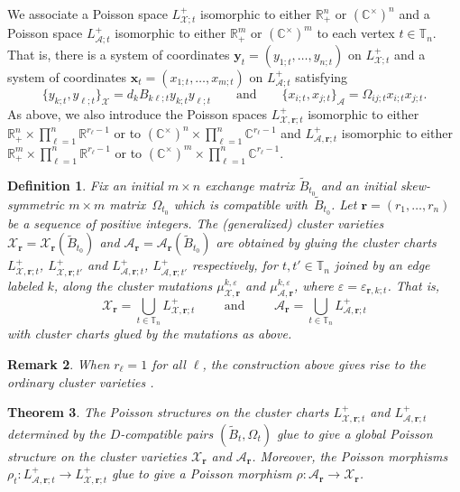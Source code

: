 \documentclass{amsart}
\newtheorem{theorem}{Theorem}[section]
\newtheorem{definition}[theorem]{Definition}
\newtheorem{remark}[theorem]{Remark}
\numberwithin{equation}{section}
\newcommand{\bfr}{{\boldsymbol{r}}}
\newcommand{\bfx}{{\boldsymbol{x}}}
\newcommand{\bfy}{{\boldsymbol{y}}}
\newcommand{\cA}{\mathcal{A}}
\newcommand{\cX}{\mathcal{X}}
\newcommand{\CC}{\mathbb{C}}
\newcommand{\RR}{\mathbb{R}}
\newcommand{\TT}{\mathbb{T}}
\begin{document}
We associate a Poisson space $L^+_{\cX;t}$ isomorphic to either $\RR_+^n$ or $(\CC^\times)^n$ and a Poisson space $L^+_{\cA;t}$ isomorphic to either $\RR_+^m$ or $(\CC^\times)^m$ to each vertex $t\in\TT_n$.
That is, there is a system of coordinates $\bfy_t=(y_{1;t},\ldots,y_{n;t})$ on $L^+_{\cX;t}$ and a system of coordinates $\bfx_t=(x_{1;t},\ldots,x_{m;t})$ on $L^+_{\cA;t}$ satisfying
\begin{equation}
  \label{eq:brackets3}
  \{y_{k;t},y_{\ell;t}\}_\cX=d_kB_{k\ell;t}y_{k;t}y_{\ell;t}\qquad\text{and}\qquad\{x_{i;t},x_{j;t}\}_\cA=\Omega_{ij;t}x_{i;t}x_{j;t}.
\end{equation}
As above, we also introduce the Poisson spaces $L^+_{\cX,\bfr;t}$ isomorphic to either $\RR_+^n\times\prod_{\ell=1}^n \RR^{r_\ell-1}$ or to $(\CC^\times)^n\times\prod_{\ell=1}^n \CC^{r_\ell-1}$ and $L^+_{\cA,\bfr;t}$ isomorphic to either $\RR_+^m\times\prod_{\ell=1}^n \RR^{r_\ell-1}$ or to $(\CC^\times)^m\times\prod_{\ell=1}^n \CC^{r_\ell-1}$.

\begin{definition}
  \label{def:cluster varieties}
  Fix an initial $m\times n$ exchange matrix $\tilde B_{t_0}$ and an initial skew-symmetric $m\times m$ matrix~$\Omega_{t_0}$ which is compatible with~$\tilde B_{t_0}$.
  Let $\bfr=(r_1,\ldots,r_n)$ be a sequence of positive integers.
  The \emph{(generalized) cluster varieties} $\cX_\bfr=\cX_\bfr(\tilde B_{t_0})$ and $\cA_\bfr=\cA_\bfr(\tilde B_{t_0})$ are obtained by gluing the cluster charts $L^+_{\cX,\bfr;t}$, $L^+_{\cX,\bfr;t'}$ and $L^+_{\cA,\bfr;t}$, $L^+_{\cA,\bfr;t'}$ respectively, for $t,t'\in\TT_n$ joined by an edge labeled $k$, along the cluster mutations $\mu_{\cX,\bfr}^{k,\varepsilon}$ and $\mu_{\cA,\bfr}^{k,\varepsilon}$, where $\varepsilon=\varepsilon_{\bfr,k;t}$.
  That is, 
  \begin{equation}
    \label{eq:cluster varieties}
    \cX_\bfr=\bigcup_{t\in\TT_n} L^+_{\cX,\bfr;t}\qquad\text{ and }\qquad\cA_\bfr=\bigcup_{t\in\TT_n} L^+_{\cA,\bfr;t}
  \end{equation}
  with cluster charts glued by the mutations as above.
\end{definition}
\begin{remark}
  When $r_\ell=1$ for all $\ell$, the construction above gives rise to the ordinary cluster varieties \cite{FZ01,FG09a}.
\end{remark}

\begin{theorem}
  \cite{GSV10}
  The Poisson structures on the cluster charts $L^+_{\cX,\bfr;t}$ and $L^+_{\cA,\bfr;t}$ determined by the $D$-compatible pairs $(\tilde B_t,\Omega_t)$ glue to give a global Poisson structure on the cluster varieties $\cX_\bfr$ and $\cA_\bfr$.
  Moreover, the Poisson morphisms $\rho_t:L^+_{\cA,\bfr;t}\to L^+_{\cX,\bfr;t}$ glue to give a Poisson morphism $\rho:\cA_\bfr\to\cX_\bfr$.
\end{theorem}
\end{document}
